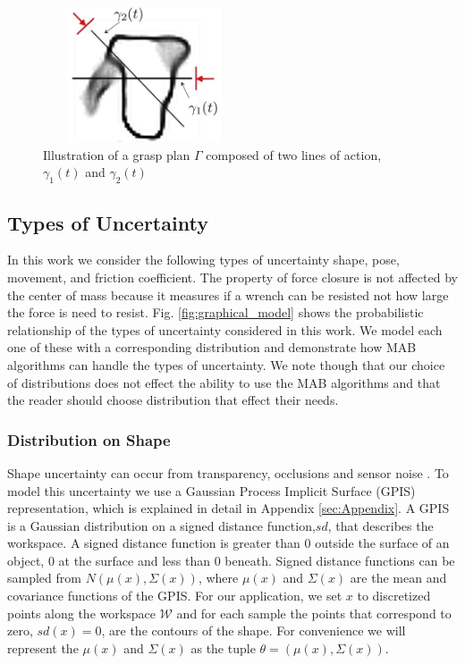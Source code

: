 \documentclass[journal,transmag]{IEEEtran}%
\begin{document}
\begin{figure}[ht!]
\centering
\includegraphics[width = 6cm, height = 4cm]{figures/Slide01.jpg}
\caption{Illustration of a grasp plan $\Gamma$ composed of two lines of action, $\gamma_1(t)$ and $\gamma_2(t)$}
\vspace*{-10pt}
\label{fig:line_of_action}
\end{figure}

\subsection{Types of Uncertainty}
In this work we consider the following types of uncertainty shape, pose, movement, and friction coefficient.  The property of force closure is not affected by the center of mass because it  measures if a wrench can be resisted not how large the force is need to resist.  Fig. \ref{fig:graphical_model} shows the probabilistic relationship of the types of uncertainty considered in this work. We model each one of these with a corresponding distribution and demonstrate how MAB algorithms can handle the types of uncertainty. We note though that our choice of distributions does not effect the ability to use the MAB algorithms and that the reader should choose distribution that effect their needs. 

\subsubsection{Distribution on Shape}

Shape uncertainty can occur from transparency, occlusions and sensor noise \cite{mahler}. To model this uncertainty we use a Gaussian Process Implicit Surface (GPIS) representation, which is explained in detail in Appendix \ref{sec:Appendix}.  A GPIS is a Gaussian distribution on a signed distance function,$sd$, that describes the workspace. A signed distance function is  greater than 0 outside the surface of an object, 0 at the surface and less than 0 beneath.  Signed distance functions can be sampled from  $N(\mu(x),\Sigma(x))$, where $\mu(x)$ and $\Sigma(x)$ are the mean and covariance functions of the GPIS. For our application, we set $x$ to discretized points along the workspace $\mathcal{W}$ and for each sample the points that correspond to zero, $sd(x) = 0$, are the contours of the shape. For convenience we will  represent the $\mu(x)$ and $\Sigma(x)$ as the tuple $\theta = \left( \mu(x), \Sigma(x) \right)$. 
\end{document}
